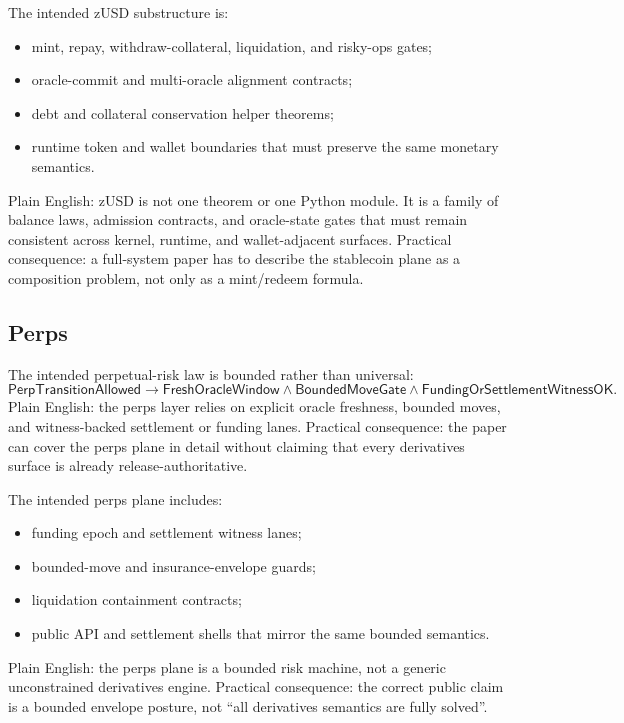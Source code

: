 \documentclass[10pt]{extarticle}
\begin{document}
The intended zUSD substructure is:
\begin{itemize}
  \item mint, repay, withdraw-collateral, liquidation, and risky-ops gates;
  \item oracle-commit and multi-oracle alignment contracts;
  \item debt and collateral conservation helper theorems;
  \item runtime token and wallet boundaries that must preserve the same
  monetary semantics.
\end{itemize}
Plain English: zUSD is not one theorem or one Python module. It is a family
of balance laws, admission contracts, and oracle-state gates that must remain
consistent across kernel, runtime, and wallet-adjacent surfaces.
Practical consequence: a full-system paper has to describe the stablecoin plane
as a composition problem, not only as a mint/redeem formula.

\subsection{Perps}
The intended perpetual-risk law is bounded rather than universal:
\[
\mathsf{PerpTransitionAllowed}
\to \mathsf{FreshOracleWindow}
\wedge \mathsf{BoundedMoveGate}
\wedge \mathsf{FundingOrSettlementWitnessOK}.
\]
Plain English: the perps layer relies on explicit oracle freshness, bounded
moves, and witness-backed settlement or funding lanes.
Practical consequence: the paper can cover the perps plane in detail without
claiming that every derivatives surface is already release-authoritative.

The intended perps plane includes:
\begin{itemize}
  \item funding epoch and settlement witness lanes;
  \item bounded-move and insurance-envelope guards;
  \item liquidation containment contracts;
  \item public API and settlement shells that mirror the same bounded semantics.
\end{itemize}
Plain English: the perps plane is a bounded risk machine, not a generic
unconstrained derivatives engine.
Practical consequence: the correct public claim is a bounded envelope posture,
not ``all derivatives semantics are fully solved''.
\end{document}
